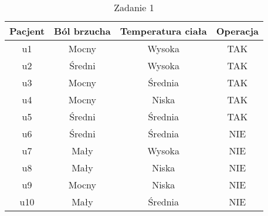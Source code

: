 \documentclass[a4paper]{article}
\begin{document}
\begin{table}[h]
\centering\caption{Zadanie 1}
\begin{tabular}{c|c c c}
\hline
\hline
Pacjent & Ból brzucha & Temperatura ciała & Operacja\\
\hline
u1 & Mocny & Wysoka & TAK\\
u2 & Średni & Wysoka & TAK\\
u3 & Mocny & Średnia & TAK\\
u4 & Mocny & Niska & TAK\\
u5 & Średni & Średnia & TAK\\
u6 & Średni & Średnia & NIE\\
u7 & Mały & Wysoka & NIE\\
u8 & Mały & Niska & NIE\\
u9 & Mocny & Niska & NIE\\
u10 & Mały & Średnia & NIE\\
\hline
\hline
\end{tabular}
\end{table}
\end{document}

